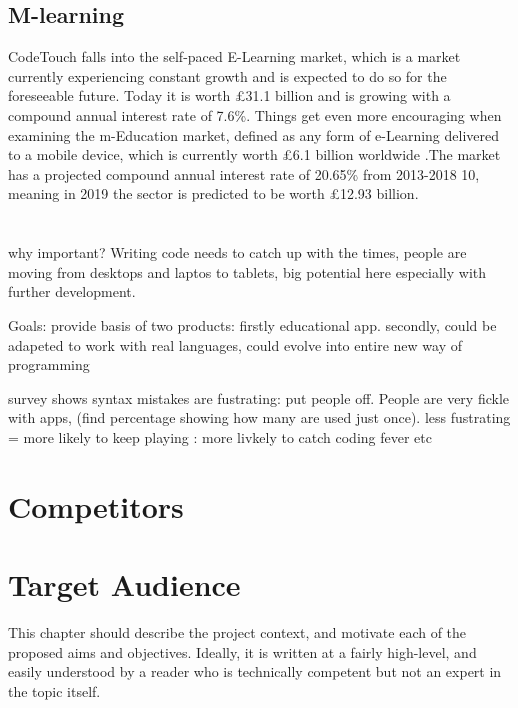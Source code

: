 \documentclass[ %
                    author={Jonathan Rankin},
                supervisor={Dr. David May, Dr. Ian Holyer},
                    degree={MEng},
                     title={CodeTouch},
                  subtitle={A Revolutionary Way To Program Real Code On Touch Screen Devices},
                      type={enterprise},
                      year={2015 } ]{dissertation}
\begin{document}
 

\subsection{M-learning}


CodeTouch falls into the self-paced E-Learning market, which is a market currently experiencing constant growth and is expected to do so for the foreseeable future. Today it is worth £31.1 billion and is growing with a compound annual interest rate of 7.6\%.
Things get even more encouraging when examining the m-Education market, defined as any form of e-Learning delivered to a mobile device, which is currently worth £6.1 billion worldwide .The market has a projected compound annual interest rate of 20.65\% from 2013-2018 10, meaning in 2019 the sector is predicted to be worth £12.93 billion.


\section{}
why important? Writing code needs to catch up with the times, people are moving from desktops and laptos to tablets, big potential here especially with further development. 

Goals: provide basis of two products: firstly educational app. secondly, could be adapeted to work with real languages, could evolve into entire new way of programming

survey shows syntax mistakes are fustrating: put people off. People are very fickle with apps, (find percentage showing how many are used just once). less fustrating = more likely to keep playing : more livkely to catch coding fever etc

\section{Competitors}



\section{Target Audience}






This chapter should describe the project context, and motivate each of
the proposed aims and objectives.  Ideally, it is written at a fairly 
high-level, and easily understood by a reader who is technically 
competent but not an expert in the topic itself.
\end{document}
